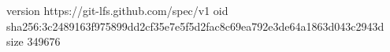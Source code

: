 version https://git-lfs.github.com/spec/v1
oid sha256:3c2489163f975899dd2cf35e7e5f5d2fac8c69ea792e3de64a1863d043c2943d
size 349676
